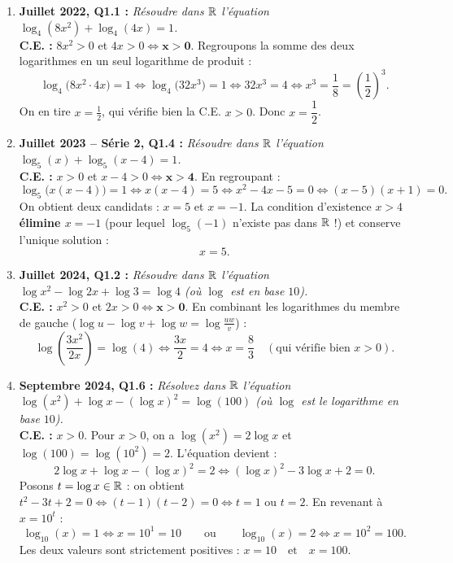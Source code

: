 \begin{exemple}
\begin{enumerate}
    \item \textbf{Juillet 2022, Q1.1 :} \emph{Résoudre dans $\mathbb{R}$ l'équation $\log_4(8x^2) + \log_4(4x) = 1$.}\\
    \textbf{C.E. :} $8x^2 > 0$ et $4x > 0 \iff \mathbf{x > 0}$.
    Regroupons la somme des deux logarithmes en un seul logarithme de produit :
    \[
        \log_4\bigl(8x^2 \cdot 4x\bigr) = 1 \iff \log_4\bigl(32x^3\bigr) = 1 \iff 32x^3 = 4 \iff x^3 = \frac{1}{8} = \left(\frac{1}{2}\right)^3.
    \]
    On en tire $x = \frac{1}{2}$, qui vérifie bien la C.E. $x > 0$. Donc $\boxed{x = \dfrac{1}{2}}$.

    \item \textbf{Juillet 2023 -- Série 2, Q1.4 :} \emph{Résoudre dans $\mathbb{R}$ l'équation $\log_5(x) + \log_5(x - 4) = 1$.}\\
    \textbf{C.E. :} $x > 0$ et $x - 4 > 0 \iff \mathbf{x > 4}$.
    En regroupant :
    \[
        \log_5\bigl(x(x - 4)\bigr) = 1 \iff x(x - 4) = 5 \iff x^2 - 4x - 5 = 0 \iff (x - 5)(x + 1) = 0.
    \]
    On obtient deux candidats : $x = 5$ et $x = -1$. La condition d'existence $x > 4$ \textbf{élimine $x = -1$} (pour lequel $\log_5(-1)$ n'existe pas dans $\mathbb{R}$ !) et conserve l'unique solution :
    \[
        \boxed{x = 5}.
    \]

    \item \textbf{Juillet 2024, Q1.2 :} \emph{Résoudre dans $\mathbb{R}$ l'équation $\log x^2 - \log 2x + \log 3 = \log 4$ (où $\log$ est en base $10$).}\\
    \textbf{C.E. :} $x^2 > 0$ et $2x > 0 \iff \mathbf{x > 0}$.
    En combinant les logarithmes du membre de gauche ($\log u - \log v + \log w = \log\frac{uw}{v}$) :
    \[
        \log\left(\frac{3x^2}{2x}\right) = \log(4) \iff \frac{3x}{2} = 4 \iff \boxed{x = \frac{8}{3}} \quad (\text{qui vérifie bien } x > 0).
    \]

    \item \textbf{Septembre 2024, Q1.6 :} \emph{Résolvez dans $\mathbb{R}$ l'équation $\log(x^2) + \log x - (\log x)^2 = \log(100)$ (où $\log$ est le logarithme en base $10$).}\\
    \textbf{C.E. :} $x > 0$. Pour $x > 0$, on a $\log(x^2) = 2\log x$ et $\log(100) = \log(10^2) = 2$. L'équation devient :
    \[
        2\log x + \log x - (\log x)^2 = 2 \iff (\log x)^2 - 3\log x + 2 = 0.
    \]
    Posons $t = \log x \in \mathbb{R}$ : on obtient $t^2 - 3t + 2 = 0 \iff (t - 1)(t - 2) = 0 \iff t = 1 \text{ ou } t = 2$.
    En revenant à $x = 10^t$ :
    \[
        \log_{10}(x) = 1 \iff x = 10^1 = 10 \qquad \text{ou} \qquad \log_{10}(x) = 2 \iff x = 10^2 = 100.
    \]
    Les deux valeurs sont strictement positives : $\boxed{x = 10 \quad \text{et} \quad x = 100}$.


\end{enumerate}
\end{exemple}
